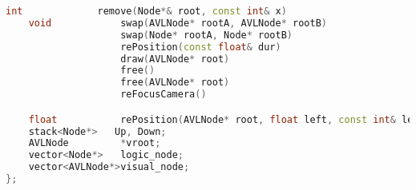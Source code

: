 \begin{lstlisting}[language=C++]
    int             remove(Node*& root, const int& x)                               ;
    void            swap(AVLNode* rootA, AVLNode* rootB)                            ,
                    swap(Node* rootA, Node* rootB)                                  ,
                    rePosition(const float& dur)                                    ,
                    draw(AVLNode* root)                                             ,
                    free()                                                          ,
                    free(AVLNode* root)                                             ,
                    reFocusCamera()                                                 ;

    float           rePosition(AVLNode* root, float left, const int& level)         ;
    stack<Node*>   Up, Down;
    AVLNode         *vroot;
    vector<Node*>   logic_node;
    vector<AVLNode*>visual_node;
};






\end{lstlisting}
